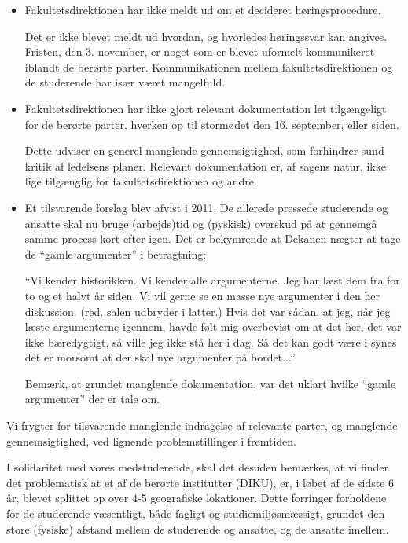 \documentclass[a4paper]{article}
\begin{document}
\begin{itemize}


\item Fakultetsdirektionen har ikke meldt ud om et decideret høringsprocedure.

Det er ikke blevet meldt ud hvordan, og hvorledes høringssvar kan angives.
Fristen, den 3.  november, er noget som er blevet uformelt kommunikeret iblandt
de berørte parter. Kommunikationen mellem fakultetsdirektionen og de studerende
har især været mangelfuld.

\item Fakultetsdirektionen har ikke gjort relevant dokumentation let
tilgængeligt for de berørte parter, hverken op til stormødet den 16.
september, eller siden.

Dette udviser en generel manglende gennemsigtighed, som forhindrer sund kritik
af ledelsens planer. Relevant dokumentation er, af sagens natur, ikke lige
tilgænglig for fakultetsdirektionen og andre.

\item Et tilsvarende forslag blev afvist i 2011. De allerede pressede
studerende og ansatte skal nu bruge (arbejds)tid og (pyskisk) overskud på at
gennemgå samme process kort efter igen. Det er bekymrende at Dekanen nægter at
tage de ``gamle argumenter'' i betragtning:

``Vi kender historikken. Vi kender alle argumenterne. Jeg har læst dem fra for
to og et halvt år siden. Vi vil gerne se en masse nye argumenter i den her
diskussion. (red. salen udbryder i latter.) Hvis det var sådan, at jeg, når jeg
læste argumenterne igennem, havde følt mig overbevist om at det her, det var
ikke bæredygtigt, så ville jeg ikke stå her i dag. Så det kan godt være i synes
det er morsomt at der skal nye argumenter på bordet...''\cite{stormoede} 

Bemærk, at grundet manglende dokumentation, var det uklart hvilke ``gamle
argumenter'' der er tale om.

\end{itemize}

Vi frygter for tilsvarende manglende indragelse af relevante parter, og
manglende gennemsigtighed, ved lignende problemstillinger i fremtiden.

I solidaritet med vores medstuderende, skal det desuden bemærkes, at vi finder
det problematisk at et af de berørte institutter (DIKU), er, i løbet af de
sidste 6 år, blevet splittet op over 4-5 geografiske lokationer. Dette
forringer forholdene for de studerende væsentligt, både fagligt og
studiemiljøsmæssigt, grundet den store (fysiske) afstand mellem de studerende
og ansatte, og de ansatte imellem.
\end{document}
